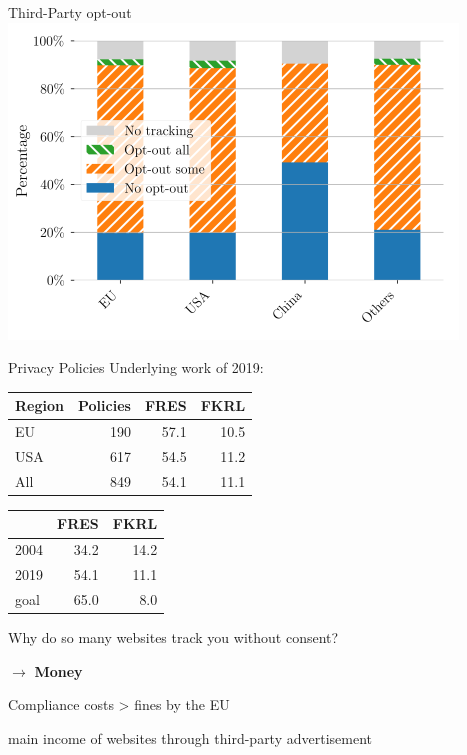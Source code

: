 \documentclass[xcolor={dvipsnames}]{beamer}
\begin{document}
\begin{frame}{Third-Party opt-out}
    \centering
    \includegraphics[scale=0.58]{figures/third_party_trans.png}
\end{frame}

\begin{frame}{Privacy Policies}
    Underlying work of 2019:\\
    \vspace{.5em}
    \centering
    \begin{tabular}{ l r r r }
        \hline
        Region & Policies & FRES & FKRL \\
        \hline
        EU & 190 & 57.1 & 10.5 \\
        USA & 617 & 54.5 & 11.2 \\
        All & 849 & 54.1 & 11.1 \\
        \hline
    \end{tabular}

    \vspace{1em}

    \begin{tabular}{ l r r }
        \hline
        & FRES & FKRL \\
        \hline
        2004 & 34.2 & 14.2 \\
        2019 & 54.1 & 11.1 \\
        goal & 65.0 & 8.0 \\
        \hline
    \end{tabular}
\end{frame}

\begin{frame}
    \centering
    Why do so many websites track you without consent?

    \pause
    $\rightarrow$ \textbf{Money}

    \pause
    Compliance costs > fines by the EU

    main income of websites through third-party advertisement
\end{frame}
\end{document}
